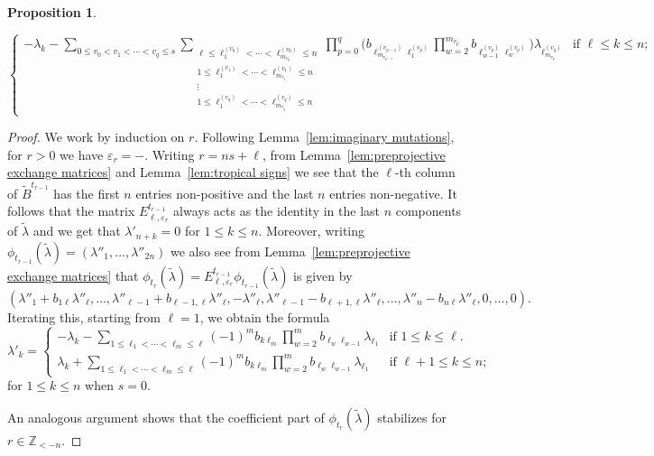 \documentclass{amsart}
\newtheorem{proposition}[theorem]{Proposition}
\numberwithin{theorem}{section}
\newcommand{\ZZ}{\mathbb{Z}}
\begin{document}
\begin{proposition}
\begin{itemize}
\begin{equation}
\begin{cases}
            -\lambda_k-\sum_{0\le v_0<v_1<\cdots<v_q\le s}\sum\limits_{\substack{\ell\le \ell^{(v_0)}_1<\cdots<\ell^{(v_0)}_{m_{v_0}}\le n\\ 1\le \ell^{(v_1)}_1<\cdots<\ell^{(v_1)}_{m_{v_1}}\le n\\ \vdots\\ 1\le \ell^{(v_q)}_1<\cdots<\ell^{(v_q)}_{m_{v_q}}\le n}} \prod\limits_{p=0}^q \Big( b_{\ell^{(v_{p-1})}_{m_{v_{p-1}}}\ell^{(v_p)}_1} \prod\limits_{w=2}^{m_{v_p}} b_{\ell^{(v_p)}_{w-1} \ell^{(v_p)}_w} \Big)\lambda_{\ell^{(v_q)}_{m_{v_q}}} & \text{if $\ell\le k\le n$;}
          \end{cases}
        \end{equation}
    \end{itemize}
  \end{proposition}
  \begin{proof}
    We work by induction on $r$.
    Following Lemma~\ref{lem:imaginary mutations}, for $r>0$ we have $\varepsilon_r=-$.
    Writing $r=ns+\ell$, from Lemma~\ref{lem:preprojective exchange matrices} and Lemma~\ref{lem:tropical signs} we see that the $\ell$-th column of $\tilde B^{t_{r-1}}$ has the first $n$ entries non-positive and the last $n$ entries non-negative.
    It follows that the matrix $E^{t_{r-1}}_{\ell,\varepsilon_r}$ always acts as the identity in the last $n$ components of $\tilde\lambda$ and we get that $\lambda'_{n+k}=0$ for $1\le k\le n$.
    Moreover, writing $\phi_{t_{r-1}}(\tilde\lambda)=(\lambda''_1,\ldots,\lambda''_{2n})$ we also see from Lemma~\ref{lem:preprojective exchange matrices} that $\phi_{t_r}(\tilde\lambda)=E^{t_{r-1}}_{\ell,\varepsilon_r}\phi_{t_{r-1}}(\tilde\lambda)$ is given by
    \[(\lambda''_1+b_{1\ell}\lambda''_\ell,\ldots,\lambda''_{\ell-1}+b_{\ell-1,\ell}\lambda''_\ell,-\lambda''_\ell,\lambda''_{\ell-1}-b_{\ell+1,\ell}\lambda''_\ell,\ldots,\lambda''_n-b_{n\ell}\lambda''_\ell,0,\ldots,0).\]
    Iterating this, starting from $\ell=1$, we obtain the formula
    \begin{equation}
      \lambda'_k=
      \begin{cases} 
        -\lambda_k-\sum\limits_{1\le \ell_1<\cdots<\ell_m\le \ell} (-1)^m b_{k\ell_m} \prod\limits_{w=2}^m b_{\ell_w \ell_{w-1}}\lambda_{\ell_1} & \text{if $1\le k\le \ell$.}\\
        \lambda_k+\sum\limits_{1\le \ell_1<\cdots<\ell_m\le \ell} (-1)^m b_{k\ell_m} \prod\limits_{w=2}^m b_{\ell_w \ell_{w-1}}\lambda_{\ell_1} & \text{if $\ell+1\le k\le n$;}
      \end{cases}
    \end{equation}
    for $1\le k\le n$ when $s=0$.

    An analogous argument shows that the coefficient part of $\phi_{t_r}(\tilde\lambda)$ stabilizes for $r\in\ZZ_{<-n}$.

  \end{proof}
\end{document}
